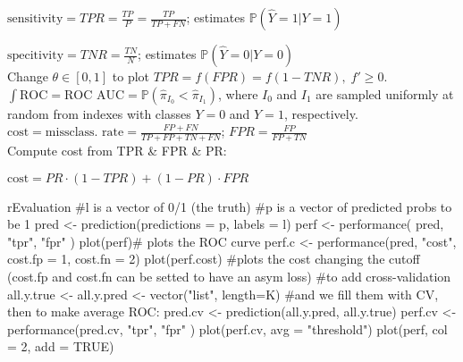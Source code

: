 $\text{sensitivity} = TPR = \frac{TP}{P}=\frac{TP}{TP+FN}$; estimates $\mathbb{P}(\hat{Y} = 1| Y = 1)$

$\text{specitivity} = TNR = \frac{TN}{N}$; estimates $\mathbb{P}(\hat{Y} = 0| Y = 0)$\\

Change $\theta \in [0, 1]$ to plot $TPR=f(FPR)=f(1-TNR),\; f'\geq 0$.
$\int\text{ROC}=\text{ROC AUC} = \mathbb{P}(\hat{\pi}_{I_0} < \hat{\pi}_{I_1})$, where $I_0$ and $I_1$ are sampled uniformly at random from indexes with classes $Y=0$ and $Y=1$, respectively.\\

$\text{cost} = \text{missclass. rate} = \frac{FP + FN}{TP + FP + TN + FN}$; $FPR = \frac{FP}{FP + TN}$ \\
Compute cost from TPR \& FPR \& PR:

$\text{cost} = PR \cdot (1 - TPR) + (1 - PR) \cdot FPR$
\begin{codebox}{r}{Evaluation}
#l is a vector of 0/1 (the truth)
#p is a vector of predicted probs to be 1
pred <- prediction(predictions = p, labels = l)
perf <- performance( pred, "tpr", "fpr" )
plot(perf)# plots the ROC curve
perf.c <- performance(pred, "cost", cost.fp = 1, cost.fn = 2)
plot(perf.cost)
#plots the cost changing the cutoff (cost.fp and cost.fn can be setted to have an asym loss)
#to add cross-validation
all.y.true <- all.y.pred <- vector("list", length=K)
#and we fill them with CV, then to make average ROC:
pred.cv <- prediction(all.y.pred, all.y.true)
perf.cv <- performance(pred.cv, "tpr", "fpr" )
plot(perf.cv, avg = "threshold")
plot(perf, col = 2, add = TRUE)
\end{codebox}
